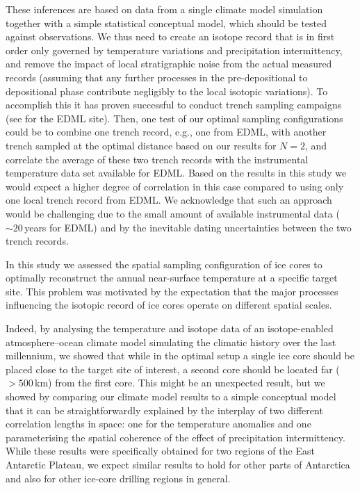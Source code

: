 \documentclass[cp, manuscript]{copernicus}
\begin{document}
These inferences are based on data from a single climate model simulation
together with a simple statistical conceptual model, which should be tested
against observations. We thus need to create an isotope record that is in first
order only governed by temperature variations and precipitation intermittency,
and remove the impact of local stratigraphic noise from the actual measured
records (assuming that any further processes in the pre-depositional to
depositional phase contribute negligibly to the local isotopic variations). To
accomplish this it has proven successful to conduct trench sampling campaigns
(see \citealp{Munch2016,Munch2017} for the EDML site). Then, one test of our
optimal sampling configurations could be to combine one trench record, e.g., one
from EDML, with another trench sampled at the optimal distance based on our
results for $N=2$, and correlate the average of these two trench records with
the instrumental temperature data set available for EDML. Based on the results
in this study we would expect a higher degree of correlation in this case
compared to using only one local trench record from EDML. We acknowledge that
such an approach would be challenging due to the small amount of available
instrumental data ($\sim20$\,years for EDML) and by the inevitable dating
uncertainties between the two trench records.

\conclusions

In this study we assessed the spatial sampling configuration of ice cores to
optimally reconstruct the annual near-surface temperature at a specific target
site. This problem was motivated by the expectation that the major processes
influencing the isotopic record of ice cores operate on different spatial
scales.

Indeed, by analysing the temperature and isotope data of an isotope-enabled
atmosphere--ocean climate model simulating the climatic history over the last
millennium, we showed that while in the optimal setup a single ice core should
be placed close to the target site of interest, a second core should be located
far ($>500$\,km) from the first core. This might be an unexpected result, but we
showed by comparing our climate model results to a simple conceptual model that
it can be straightforwardly explained by the interplay of two different
correlation lengths in space: one for the temperature anomalies and one
parameterising the spatial coherence of the effect of precipitation
intermittency. While these results were specifically obtained for two regions of
the East Antarctic Plateau, we expect similar results to hold for other parts of
Antarctica and also for other ice-core drilling regions in general.
\end{document}
